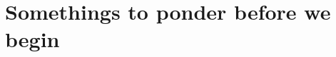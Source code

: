 \section{Somethings to ponder before we begin}
\label{act8.1.0}

\begin{FNTenv}
	
\end{FNTenv}

\WCD

%	
%

\begin{FNTenv}
	
\end{FNTenv}

\WCD